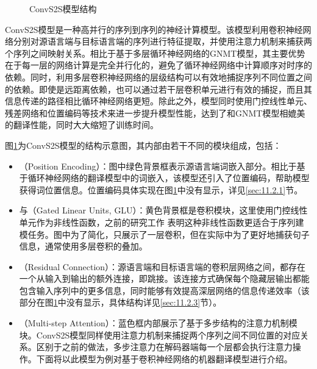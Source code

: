 \begin{figure}[htp]
\centering

\caption{ConvS2S模型结构}
\label{fig:11-12}
\end{figure}

\parinterval ConvS2S模型是一种高并行的序列到序列的神经计算模型。该模型利用卷积神经网络分别对源语言端与目标语言端的序列进行特征提取，并使用注意力机制来捕获两个序列之间映射关系。相比于基于多层循环神经网络的GNMT模型，其主要优势在于每一层的网络计算是完全并行化的，避免了循环神经网络中计算顺序对时序的依赖。同时，利用多层卷积神经网络的层级结构可以有效地捕捉序列不同位置之间的依赖。即使是远距离依赖，也可以通过若干层卷积单元进行有效的捕捉，而且其信息传递的路径相比循环神经网络更短。除此之外，模型同时使用门控线性单元、残差网络和位置编码等技术来进一步提升模型性能，达到了和GNMT模型相媲美的翻译性能，同时大大缩短了训练时间。

\parinterval 图\ref{fig:11-12}为ConvS2S模型的结构示意图，其内部由若干不同的模块组成，包括：

\begin{itemize}
\item {\small{}}（Position Encoding）：图中绿色背景框表示源语言端词嵌入部分。相比于基于循环神经网络的翻译模型中的词嵌入，该模型还引入了位置编码，帮助模型获得词位置信息。位置编码具体实现在图\ref{fig:11-12}中没有显示，详见\ref{sec:11.2.1}节。

\item {\small{}}与{\small{}}（Gated Linear Units, GLU）：黄色背景框是卷积模块，这里使用门控线性单元作为非线性函数，之前的研究工作 表明这种非线性函数更适合于序列建模任务。图中为了简化，只展示了一层卷积，但在实际中为了更好地捕获句子信息，通常使用多层卷积的叠加。

\item {\small{}}（Residual Connection）：源语言端和目标语言端的卷积层网络之间，都存在一个从输入到输出的额外连接，即跳接。该连接方式确保每个隐藏层输出都能包含输入序列中的更多信息，同时能够有效提高深层网络的信息传递效率（该部分在图\ref{fig:11-12}中没有显示，具体结构详见\ref{sec:11.2.3}节）。

\item {\small{}}（Multi-step Attention）：蓝色框内部展示了基于多步结构的注意力机制模块。ConvS2S模型同样使用注意力机制来捕捉两个序列之间不同位置的对应关系。区别于之前的做法，多步注意力在解码器端每一个层都会执行注意力操作。下面将以此模型为例对基于卷积神经网络的机器翻译模型进行介绍。
\end{itemize}

